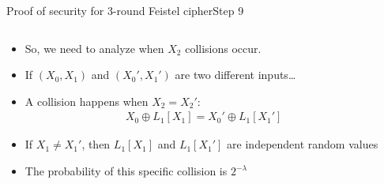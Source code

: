 \documentclass[aspectratio=169, lualatex, handout]{beamer}
\begin{document}
\begin{frame}{Proof of security for 3-round Feistel cipher}{Step 9}
	\begin{columns}[c]
		\begin{column}{0.6\textwidth}
			\begin{itemize}[<+->]
				\item So, we need to analyze when $X_2$ collisions occur.
				\item If $(X_0, X_1)$ and $(X_0', X_1')$ are two different inputs\ldots
				\item A collision happens when $X_2 = X_2'$:
				      \begin{align*}
					      X_0 \oplus L_1[X_1] = X_0' \oplus L_1[X_1']
				      \end{align*}
				\item If $X_1 \neq X_1'$, then $L_1[X_1]$ and $L_1[X_1']$ are independent random values
				\item The probability of this specific collision is $2^{-\lambda}$
			\end{itemize}
		\end{column}
		\begin{column}{0.4\textwidth}
			\vspace{-1.5cm}
			\begin{center}
			\end{center}
		\end{column}
	\end{columns}
\end{frame}
\end{document}

